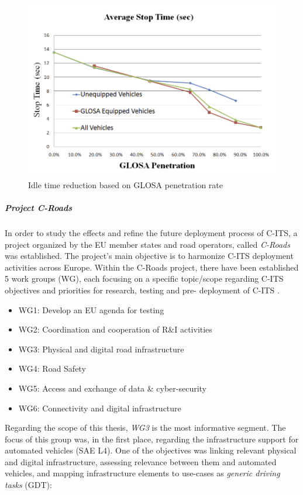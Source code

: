 \documentclass[main.tex]{subfiles}
\begin{document}
\begin{figure}[htbp]
    \centering
    \includegraphics[width=.8\textwidth]{glosa-perf-chart.png} 
    \caption{Idle time reduction based on GLOSA penetration rate \cite{Katsaros_2011}}
    \label{glosa-chart}
\end{figure}

\subparagraph{Project C-Roads}\label{sec-croads}

In order to study the effects and refine the future deployment process of C-ITS, a project 
organized by the EU member states and road operators, called \emph{C-Roads} was established. 
The project's main objective is to harmonize C-ITS deployment activities across Europe. 
Within the C-Roads project, there have been established 5 work groups (WG), each focusing on a 
specific topic/scope regarding C-ITS objectives and priorities for research, testing and pre-
deployment of C-ITS \cite{Commision2021}. 

\begin{itemize}
    \item WG1: Develop an EU agenda for testing
    \item WG2: Coordination and cooperation of R\&I activities
    \item WG3: Physical and digital road infrastructure
    \item WG4: Road Safety
    \item WG5: Access and exchange of data \& cyber-security
    \item WG6: Connectivity and digital infrastructure
\end{itemize}

Regarding the scope of this thesis, \emph{WG3} is the most informative segment. The focus of this group 
was, in the first place, regarding the infrastructure support for automated vehicles (SAE L4). One of 
the objectives was linking relevant physical and digital infrastructure, assessing relevance between 
them and automated vehicles, and mapping infrastructure elements to use-cases as \emph{generic driving 
tasks} (GDT):
\end{document}

